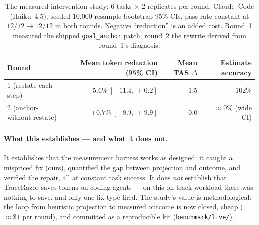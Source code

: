 \documentclass[11pt]{article}
\newcommand{\code}[1]{\texttt{#1}}
\begin{document}
\begin{table}[t]
\centering
\caption{The measured intervention study: 6 tasks $\times$ 2 replicates per
round, Claude~Code (Haiku~4.5), seeded 10{,}000-resample bootstrap 95\% CIs,
pass rate constant at $12/12 \to 12/12$ in both rounds. Negative ``reduction''
is an added cost. Round~1 measured the shipped \code{goal\_anchor} patch;
round~2 the rewrite derived from round~1's diagnosis.}
\label{tab:livestudy}
\begin{tabular}{lrrr}
\toprule
Round & Mean token reduction (95\% CI) & Mean TAS $\Delta$ & Estimate accuracy \\
\midrule
1 (restate-each-step)     & $-5.6\%\ [-11.4,\,+0.2]$ & $-1.5$ & $-102\%$ \\
2 (anchor-without-restate) & $+0.7\%\ [-8.9,\,+9.9]$  & $-0.0$ & $\approx 0\%$ (wide CI) \\
\bottomrule
\end{tabular}
\end{table}

\paragraph{What this establishes --- and what it does not.} It establishes
that the measurement harness works as designed: it caught a mispriced fix
(ours), quantified the gap between projection and outcome, and verified the
repair, all at constant task success. It does \emph{not} establish that
TraceRazor saves tokens on coding agents --- on this on-track workload there
was nothing to save, and only one fix type fired. The study's value is
methodological: the loop from heuristic projection to measured outcome is now
closed, cheap ($\approx\$1$ per round), and committed as a reproducible kit
(\code{benchmark/live/}).
\end{document}

